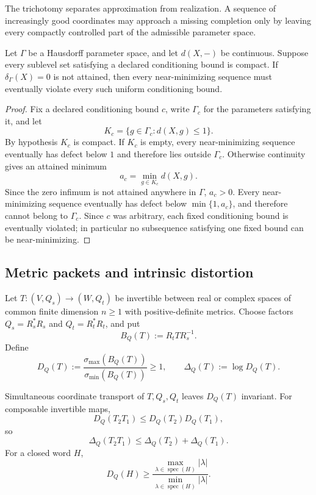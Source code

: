 The trichotomy separates approximation from realization.  A sequence of increasingly good coordinates may approach a missing completion only by leaving every compactly controlled part of the admissible parameter space.

\begin{proposition}
\label{prop:block19-escape-compactness}
Let \(\Gamma\) be a Hausdorff parameter space, and let \(d(X,-)\) be continuous.  Suppose every sublevel set satisfying a declared conditioning bound is compact.  If \(\delta_\Gamma(X)=0\) is not attained, then every near-minimizing sequence must eventually violate every such uniform conditioning bound.
\end{proposition}

\begin{proof}
Fix a declared conditioning bound \(c\), write \(\Gamma_c\) for the
parameters satisfying it, and let
\[
 K_c=\{g\in\Gamma_c:d(X,g)\leq 1\}.
\]
By hypothesis \(K_c\) is compact.  If \(K_c\) is empty, every near-minimizing
sequence eventually has defect below \(1\) and therefore lies outside
\(\Gamma_c\).  Otherwise continuity gives an attained minimum
\[
 a_c=\min_{g\in K_c}d(X,g).
\]
Since the zero infimum is not attained anywhere in \(\Gamma\), \(a_c>0\).
Every near-minimizing sequence eventually has defect below
\(\min\{1,a_c\}\), and therefore cannot belong to \(\Gamma_c\).  Since \(c\)
was arbitrary, each fixed conditioning bound is eventually violated; in
particular no subsequence satisfying one fixed bound can be near-minimizing.
\end{proof}

\subsection{Metric packets and intrinsic distortion}
\label{subsec:block19-metric-distortion}

Let \(T:(V,Q_s)\to(W,Q_t)\) be invertible between real or complex spaces of common finite dimension \(n\geq1\) with positive-definite metrics.  Choose factors \(Q_s=R_s^*R_s\) and \(Q_t=R_t^*R_t\), and put
\[
 B_Q(T):=R_tTR_s^{-1}.
\]
Define
\[
 D_Q(T)
 :=
 \frac{\sigma_{\max}(B_Q(T))}{\sigma_{\min}(B_Q(T))}
 \geq1,
 \qquad
 \Delta_Q(T):=\log D_Q(T).
\]

\begin{proposition}
\label{prop:block19-distortion-cocycle}
Simultaneous coordinate transport of \(T,Q_s,Q_t\) leaves \(D_Q(T)\) invariant.  For composable invertible maps,
\[
 D_Q(T_2T_1)
 \leq
 D_Q(T_2)D_Q(T_1),
\]
so
\[
 \Delta_Q(T_2T_1)
 \leq
 \Delta_Q(T_2)+\Delta_Q(T_1).
\]
For a closed word \(H\),
\[
 D_Q(H)
 \geq
 \frac{\max_{\lambda\in\operatorname{spec}(H)}|\lambda|}
      {\min_{\lambda\in\operatorname{spec}(H)}|\lambda|}.
\]
\end{proposition}

